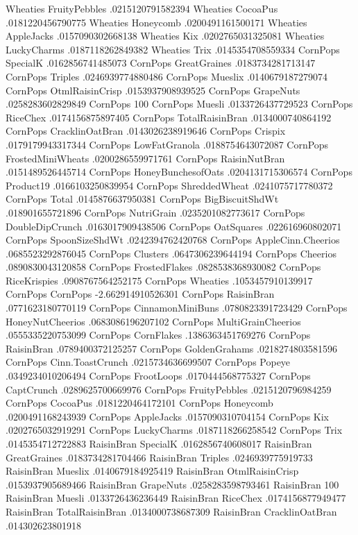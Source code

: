 Wheaties	FruityPebbles	.0215120791582394
Wheaties	CocoaPus	.0181220456790775
Wheaties	Honeycomb	.0200491161500171
Wheaties	AppleJacks	.0157090302668138
Wheaties	Kix	.0202765031325081
Wheaties	LuckyCharms	.0187118262849382
Wheaties	Trix	.0145354708559334
CornPops	SpecialK	.0162856741485073
CornPops	GreatGraines	.0183734281713147
CornPops	Triples	.0246939774880486
CornPops	Mueslix	.0140679187279074
CornPops	OtmlRaisinCrisp	.0153937908939525
CornPops	GrapeNuts	.0258283602829849
CornPops	100%
CornPops	Muesli	.0133726437729523
CornPops	RiceChex	.0174156875897405
CornPops	TotalRaisinBran	.0134000740864192
CornPops	CracklinOatBran	.0143026238919646
CornPops	Crispix	.0179179943317344
CornPops	LowFatGranola	.0188754643072087
CornPops	FrostedMiniWheats	.0200286559971761
CornPops	RaisinNutBran	.0151489526445714
CornPops	HoneyBunchesofOats	.0204131715306574
CornPops	Product19	.0166103250839954
CornPops	ShreddedWheat	.0241075717780372
CornPops	Total	.0145876637950381
CornPops	BigBiscuitShdWt	.018901655721896
CornPops	NutriGrain	.0235201082773617
CornPops	DoubleDipCrunch	.0163017909438506
CornPops	OatSquares	.022616960802071
CornPops	SpoonSizeShdWt	.0242394762420768
CornPops	AppleCinn.Cheerios	.0685523292876045
CornPops	Clusters	.0647306239644194
CornPops	Cheerios	.0890830043120858
CornPops	FrostedFlakes	.0828538368930082
CornPops	RiceKrispies	.0908767564252175
CornPops	Wheaties	.1053457910139917
CornPops	CornPops	-2.662914910526301
CornPops	RaisinBran	.0771623180770119
CornPops	CinnamonMiniBuns	.0780823391723429
CornPops	HoneyNutCheerios	.0683086196207102
CornPops	MultiGrainCheerios	.0555335220753099
CornPops	CornFlakes	.1386363451769276
CornPops	RaisinBran	.0789400372125257
CornPops	GoldenGrahams	.0218274803581596
CornPops	Cinn.ToastCrunch	.0215734636699507
CornPops	Popeye	.0349234010206494
CornPops	FrootLoops	.0170444568775327
CornPops	CaptCrunch	.0289625700669976
CornPops	FruityPebbles	.0215120796984259
CornPops	CocoaPus	.0181220464172101
CornPops	Honeycomb	.0200491168243939
CornPops	AppleJacks	.0157090310704154
CornPops	Kix	.0202765032919291
CornPops	LuckyCharms	.0187118266258542
CornPops	Trix	.0145354712722883
RaisinBran	SpecialK	.0162856740608017
RaisinBran	GreatGraines	.0183734281704466
RaisinBran	Triples	.0246939775919733
RaisinBran	Mueslix	.0140679184925419
RaisinBran	OtmlRaisinCrisp	.0153937905689466
RaisinBran	GrapeNuts	.0258283598793461
RaisinBran	100%
RaisinBran	Muesli	.0133726436236449
RaisinBran	RiceChex	.0174156877949477
RaisinBran	TotalRaisinBran	.0134000738687309
RaisinBran	CracklinOatBran	.014302623801918
